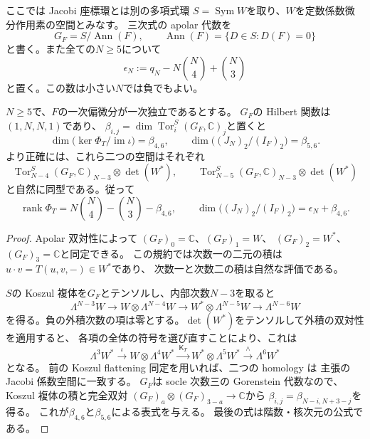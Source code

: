 ここでは Jacobi 座標環とは別の多項式環
$S=\operatorname{Sym}W$を取り、$W$を定数係数微分作用素の空間とみなす。
三次式の apolar 代数を
\[
 G_F=S/\operatorname{Ann}(F),\qquad
 \operatorname{Ann}(F)=\{D\in S:D(F)=0\}
\]
と書く。また全ての$N\ge5$について
\[
 \epsilon_N:=q_N-N\binom N4+\binom N3
\]
と置く。この数は小さい$N$では負でもよい。

\begin{lemma}
\label{lem:nfold-apolar-betti}
$N\ge5$で、$F$の一次偏微分が一次独立であるとする。
$G_F$の Hilbert 関数は$(1,N,N,1)$であり、
$\beta_{i,j}=\dim\operatorname{Tor}^S_i(G_F,\mathbb C)_j$と置くと
\[
 \dim\bigl(\ker\Phi_T/\operatorname{im}\iota\bigr)=\beta_{4,6},
 \qquad
 \dim\bigl((J_N)_2/(I_F)_2\bigr)=\beta_{5,6}.
\]
より正確には、これら二つの空間はそれぞれ
\[
 \operatorname{Tor}^S_{N-4}(G_F,\mathbb C)_{N-3}
       \otimes\det(W^*),\qquad
 \operatorname{Tor}^S_{N-5}(G_F,\mathbb C)_{N-3}
       \otimes\det(W^*)
\]
と自然に同型である。従って
\[
 \operatorname{rank}\Phi_T
  =N\binom N4-\binom N3-\beta_{4,6},
 \qquad
 \dim\bigl((J_N)_2/(I_F)_2\bigr)=\epsilon_N+\beta_{4,6}.
\]
\end{lemma}
\begin{proof}
Apolar 双対性によって
$(G_F)_0=\mathbb C$、$(G_F)_1=W$、
$(G_F)_2=W^*$、$(G_F)_3=\mathbb C$と同定できる。
この規約では次数一の二元の積は
$u\cdot v=T(u,v,-)\in W^*$であり、
次数一と次数二の積は自然な評価である。

$S$の Koszul 複体を$G_F$とテンソルし、内部次数$N-3$を取ると
\[
 \Lambda^{N-3}W
 \longrightarrow W\otimes\Lambda^{N-4}W
 \longrightarrow W^*\otimes\Lambda^{N-5}W
 \longrightarrow\Lambda^{N-6}W
\]
を得る。負の外積次数の項は零とする。$\det(W^*)$をテンソルして外積の双対性を適用すると、
各項の全体の符号を選び直すことにより、これは
\[
 \Lambda^3W^*\xrightarrow{\ \iota\ }
 W\otimes\Lambda^4W^*
 \xrightarrow{\ \mathsf K_T\ }
 W^*\otimes\Lambda^5W^*
 \xrightarrow{\ \wedge\ }\Lambda^6W^*
\]
となる。
前の Koszul flattening 同定を用いれば、二つの homology は
主張の Jacobi 係数空間に一致する。
$G_F$は socle 次数三の Gorenstein 代数なので、
Koszul 複体の積と完全双対
$(G_F)_a\otimes(G_F)_{3-a}\to\mathbb C$から
$\beta_{i,j}=\beta_{N-i,N+3-j}$を得る。
これが$\beta_{4,6}$と$\beta_{5,6}$による表式を与える。
最後の式は階数・核次元の公式である。
\end{proof}

